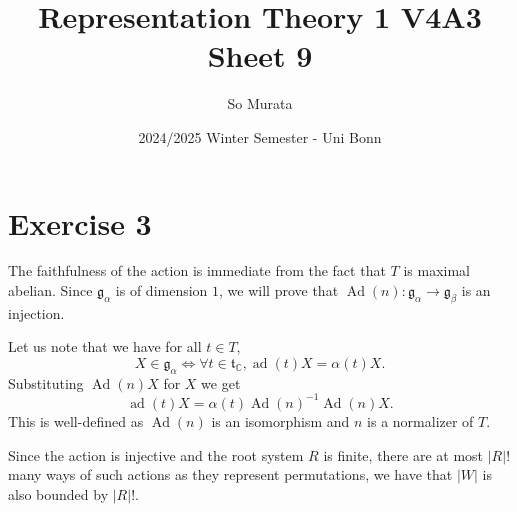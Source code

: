 \documentclass{article}
\title{Representation Theory 1 V4A3 Sheet 9}
\author{So Murata}
\date{2024/2025 Winter Semester - Uni Bonn}
\numberwithin{equation}{section}
\DeclareMathOperator{\Ad}{Ad}
\DeclareMathOperator{\ad}{ad}
\begin{document}
\maketitle
\section{Exercise 3}
The faithfulness of the action is immediate from the fact that $T$ is maximal abelian. 
Since $\mathfrak{g}_{\alpha}$ is of dimension $1$, we will prove that $\Ad(n):\mathfrak{g}_{\alpha}\to\mathfrak{g}_{\beta}$ is an injection. \\\par
Let us note that we have for all $t\in T$, 
\begin{equation*}
X\in \mathfrak{g}_\alpha\Leftrightarrow \forall t\in \mathfrak{t}_{\mathbb{C}}, \ad(t)X = \alpha(t)X.
\end{equation*}
Substituting $\Ad(n)X$ for $X$ we get
\begin{equation*}
\ad(t) X = \alpha(t)\Ad(n)^{-1}\Ad(n)X.
\end{equation*}
This is well-defined as $\Ad(n)$ is an isomorphism and $n$ is a normalizer of $T$.\\
\par Since the action is injective and the root system $R$ is finite, there are at most $|R|!$ many ways of such actions as they represent permutations, we have that $|W|$ is also bounded by $|R|!$. 
\end{document}
